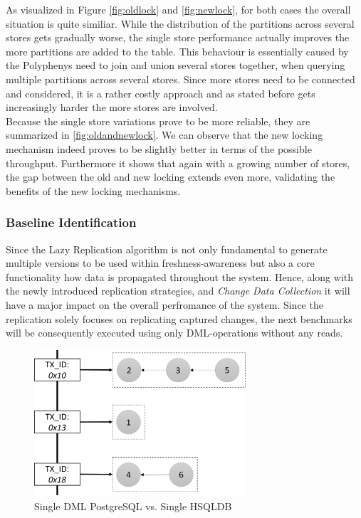 As visualized in Figure \ref{fig:oldlock} and \ref{fig:newlock}, for both cases the overall situation is quite similiar.
While the distribution of the partitions across several stores gets gradually worse, the single store performance actually improves the more partitions are added to the table.
This behaviour is essentially caused by the Polyphenys need to join and union several stores together, when querying multiple partitions across several stores.
Since more stores need to be connected and considered, it is a rather costly approach and as stated before gets increasingly harder the more stores are involved.\\

Because the single store variations prove to be more reliable, they are summarized in \ref{fig:oldandnewlock}.
We can observe that the new locking mechanism indeed proves to be slightly better in terms of the possible throughput.
Furthermore it shows that again with a growing number of stores, the gap between the old and new locking extends even more, validating the benefits of the new locking mechanisms.






\subsubsection{Baseline Identification} 

Since the Lazy Replication algorithm is not only fundamental to generate multiple versions to be used within freshness-awareness
but also a core functionality how data is propagated throughout the system. 
Hence, along with the newly introduced replication strategies, and \emph{Change Data Collection} it will have a major impact on the overall perfromance of the system.
Since the replication solely focuses on replicating captured changes, the next benchmarks will be consequently executed using only DML-operations without any reads.\\

\begin{figure}[t] 
    \centering 
    \includegraphics[width=0.7\textwidth]{Figures/store_comparision.png}
    \caption{Single DML PostgreSQL vs. Single HSQLDB}
    \label{fig:singlepsqlhsql}
\end{figure}

